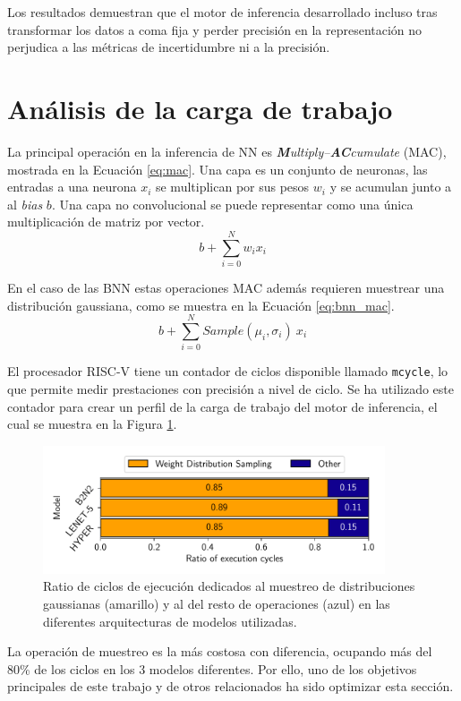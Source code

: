 Los resultados demuestran que el motor de inferencia desarrollado incluso tras transformar los datos a coma fija y perder precisión en la representación no perjudica a las métricas de incertidumbre ni a la precisión.

\section{Análisis de la carga de trabajo}

La principal operación en la inferencia de NN es \textit{\textbf{M}ultiply–\textbf{AC}cumulate} (MAC), mostrada en la Ecuación \ref{eq:mac}. Una capa es un conjunto de neuronas, las entradas a una neurona $x_i$ se multiplican por sus pesos $w_i$ y se acumulan junto a al \textit{bias} $b$. Una capa no convolucional se puede representar como una única multiplicación de matriz por vector.
\begin{equation} \label{eq:mac}
b + \sum_{i=0}^N w_i x_i
\end{equation}

En el caso de las BNN estas operaciones MAC además requieren muestrear una distribución gaussiana, como se muestra en la Ecuación \ref{eq:bnn_mac}.
\begin{equation} \label{eq:bnn_mac}
b + \sum_{i=0}^N Sample(\mu_i, \sigma_i)\ x_i
\end{equation}

El procesador RISC-V tiene un contador de ciclos disponible llamado \texttt{mcycle}, lo que permite medir prestaciones con precisión a nivel de ciclo. Se ha utilizado este contador para crear un perfil de la carga de trabajo del motor de inferencia, el cual se muestra en la Figura \ref{fig:cycle_profile}.

\begin{figure}[h]
	\centering
	\includegraphics[width=0.9\textwidth]{root/Imagenes/bnn_lib/cycles.pdf}
	\caption{Ratio de ciclos de ejecución dedicados al muestreo de distribuciones gaussianas (amarillo) y al del resto de operaciones (azul) en las diferentes arquitecturas de modelos utilizadas.}
	\label{fig:cycle_profile}
\end{figure}

La operación de muestreo es la más costosa con diferencia, ocupando más del 80\% de los ciclos en los 3 modelos diferentes. Por ello, uno de los objetivos principales de este trabajo y de otros relacionados ha sido optimizar esta sección.
